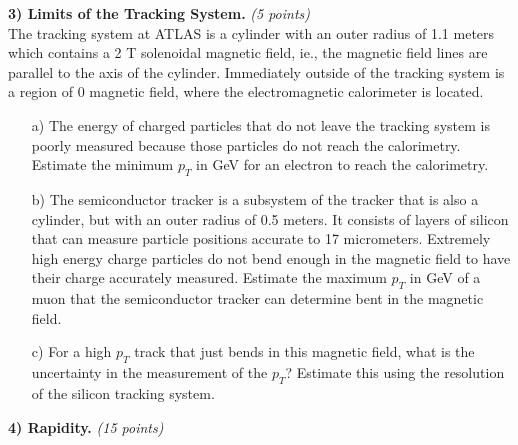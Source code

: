 {\vspace*{0.25in}

\textbf{3) Limits of the Tracking System.} \hfill \textit{(5 points)}\\

The tracking system at ATLAS is a cylinder with an outer radius of 1.1 meters which contains a 2 T solenoidal magnetic field, ie., the magnetic field lines are parallel to the axis of the cylinder. 
Immediately outside of the tracking system is a region of 0 magnetic field, where the electromagnetic calorimeter is located.

\begin{itemize}
\item[a)]{
The energy of charged particles that do not leave the tracking system is poorly measured because those particles do not reach the calorimetry. 
Estimate the minimum $p_T$ in GeV for an electron to reach the calorimetry.
}

\item[b)]{
The semiconductor tracker is a subsystem of the tracker that is also a cylinder, but with an outer radius of 0.5 meters. 
It consists of layers of silicon that can measure particle positions accurate to 17 micrometers. 
Extremely high energy charge particles do not bend enough in the magnetic field to have their charge accurately measured. 
Estimate the maximum $p_T$ in GeV of a muon that the semiconductor tracker can determine bent in the magnetic field.
}
\item[c)]{
For a high $p_T$ track that just bends in this magnetic field, what is the uncertainty in the measurement of the $p_T$? Estimate this using the resolution of the silicon tracking system.
}
\end{itemize}

\vspace*{0.25in}

\textbf{4) Rapidity.} \hfill \textit{(15 points)}\\

}
